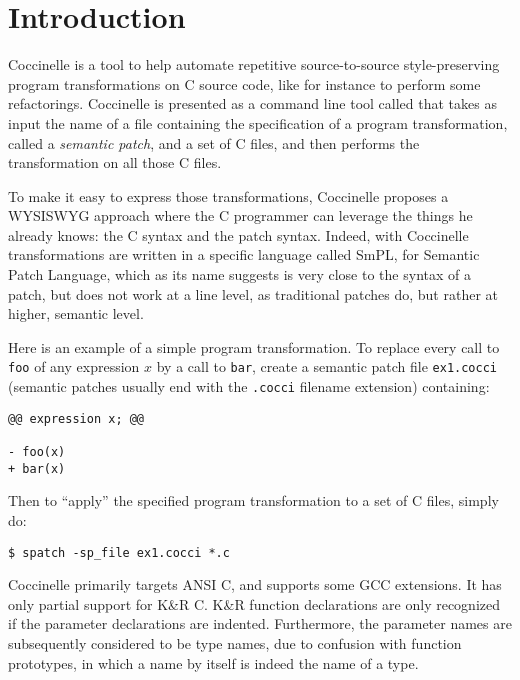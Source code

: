 \chapter{Introduction}

Coccinelle is a tool to help automate repetitive 
source-to-source style-preserving program transformations
on C source code, like for instance to perform some refactorings.
Coccinelle is presented as a command line tool called \spatch that takes
as input the name of a file containing the specification of a program
transformation, called a {\em semantic patch}, and a set of C files,
and then performs the transformation on all those C files.

To make it easy to express those transformations,
Coccinelle proposes a WYSISWYG approach where the C programmer 
can leverage the things he already knows: the C syntax
and the patch syntax. Indeed, with Coccinelle transformations
are written in a specific language called SmPL, for 
Semantic Patch Language, which as its name suggests is very
close to the syntax of a patch, but does not 
work at a line level, as traditional patches do,
but rather at higher, semantic level.

Here is an example of a simple program transformation.
To replace every call to \verb+foo+ of any expression $x$ 
by a call to \verb+bar+, create a semantic patch file \verb+ex1.cocci+
(semantic patches usually end with the \verb+.cocci+  filename extension)
containing:
\begin{verbatim}
@@ expression x; @@

- foo(x)
+ bar(x)

\end{verbatim}

Then to ``apply'' the specified program transformation to a set of C files,
simply do:
\begin{verbatim}
$ spatch -sp_file ex1.cocci *.c
\end{verbatim}


Coccinelle primarily targets ANSI C, and supports some GCC extensions.  It
has only partial support for K\&R C.  K\&R function declarations are only
recognized if the parameter declarations are indented.  Furthermore, the
parameter names are subsequently considered to be type names, due to
confusion with function prototypes, in which a name by itself is indeed the
name of a type.








